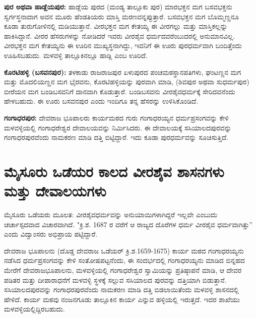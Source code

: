 \textbf{ಪುರ ಅಥವಾ ಹಾಡ್ಲೆಯಪುರ:} ಹಾಡ್ಲೆಯ ಪುರದ (ಮಂಡ್ಯ ತಾಲ್ಲೂಕು ಪುರ) ಮಾರಭಕ್ತನ ಮಗ ಬಸವಭಕ್ತನು ಸ್ವರ್ಗಸ್ಥನಾದಾಗ ಅವನ ಮೂರು ಹೆಂಡತಿಯರು ಮಾಸ್ತಿ ಮರಣವನ್ನಪ್ಪುತ್ತಾರೆ. ಬಸವಭಕ್ತನ ಮಗ ಬೊಮ್ಮಣ್ಣನೂ ಕೂಡಾ ತುರುಗೋಳಿನಲ್ಲಿ ಮಡಿಯುತ್ತಾನೆ. ವೀರಭಕ್ತನ ಮಗ ಕೇತಯ್ಯ ಈ ವೀರಗಲ್ಲು ಮತ್ತು ಮಾಸ್ತಿಕಲ್ಲನ್ನು ಹಾಕಿಸಿದ್ದಾನೆ. ವೀರರ ಹೆಸರುಗಳನ್ನು ನೋಡಿದರೆ ಇವರು ವೀರಶೈವ ಧರ್ಮದವರೆಂಬುದರಲ್ಲಿ ಅನುಮಾನವಿಲ್ಲ. ವೀರಭಕ್ತನ ಮಗ ಕೇತಯ್ಯನು ಈ ಊರಿನ ಮುಖ್ಯಸ್ಥನಾಗಿದ್ದು, ಇವನಿಗೆ ಈ ಊರು ಪುರಧರ್ಮವಾಗಿ ಬಂದಿತ್ತೆಂದು ಊಹಿಸಬಹುದು. ಮಳವಳ್ಳಿ ತಾಲ್ಲೂಕಿನಲ್ಲೂ ಹಾಡ್ಲಿ ಎಂಬ ಊರಿದೆ.

\textbf{ಕೊರಟಿಹಳ್ಳಿ (ಬಸವನಪುರ): }ತಳಕಾಡು ರಾಜರಾಜಪುರ ಏಳುಪುರದ ಪಂಚಮಠಸ್ಥಾನಪತಿಗಳು, ಘಂಟಣ್ಣನ ಮಗ ಮತ್ತು ಮೊದಲಿಯಣ್ಣನ ಮಗ ಭೈರವನು, ಕೊರಟಿಹಳ್ಳಿಯನ್ನು ಪುರವಾಗಿ ಮಾಡಿ, (ಶಿವಪುರ ಅಥವಾ ಸುಧರ್ಮಪುರ) ಬೀರೆಯನ ಮಗ ಬಂಡಿಬಸವನಿಗೆ ದಾನವಾಗಿ ಕೊಡುತ್ತಾರೆ. ಬಂಡಿಬಸವನು ವೀರಶೈವಧರ್ಮಕ್ಕೆ ಸೇರಿದವನೆಂದು ಹೇಳ\-ಬಹುದು. ಈ ಊರು ಬಸವನಪುರ ಎಂದು ಇಂದಿಗೂ ತನ್ನ ಹೆಸರನ್ನು ಉಳಿಸಿಕೊಂಡಿದೆ.

\textbf{ಗಂಗಾಧರಪುರ:} ದೇವರಾಜ ಭೂಪಾಲರು ಕಾರ್ಯಮಠದ ಗುರು ಗಂಗಾಧರಯ್ಯನ ಧರ್ಮಪ್ರಸಂಗವನ್ನು ಕೇಳಿ ಮಳವಳ್ಳಿಯಲ್ಲಿ ಗಂಗಾಧರೇಶ್ವರ ದೇವಾಲಯವನ್ನು ನಿರ್ಮಿಸಿದರು. ಈ ದೇವಾಲಯಕ್ಕೆ ಸಸಿಯಾಲದಪುರವನ್ನು ಗಂಗಾಧರಪುರವೆಂದು ನಾಮಕರಣ ಮಾಡಿ ದತ್ತಿ ಬಿಟ್ಟಿದ್ದಾರೆ. ಇದು ಕೂಡಾ ಪುರಧರ್ಮವನ್ನು ಸೂಚಿಸುತ್ತಿದೆ.


\section*{ಮೈಸೂರು ಒಡೆಯರ ಕಾಲದ ವೀರಶೈವ ಶಾಸನಗಳು ಮತ್ತು ದೇವಾಲಯಗಳು}

ಮೈಸೂರು ಒಡೆಯರು ಮೂಲತ: ವೀರಶೈವಧರ್ಮವನ್ನು ಅನುಯಾಯಿಗಳಾಗಿದ್ದರೆ ಇಲ್ಲವೇ ಎಂಬುದು ಚರ್ಚಾಸ್ಪದವಾದ ವಿಚಾರವಾಗಿದೆ. "ಕ್ರಿ.ಶ. 1687 ರ ವರೆಗೆ ಆ ರಾಜ್ಯದ ದೊರೆಗಳ ಧರ್ಮ ವೀರಶೈವ ಧರ್ಮವಾಗಿತ್ತು” ಎಂದು ವಿದ್ವಾಂಸರು ಅಭಿಪ್ರಾಯ ಪಟ್ಟಿದ್ದಾರೆ.

ದೇವರಾಜ ಭೂಪಾಲನು (ದೊಡ್ಡ ದೇವರಾಜ ಒಡೆಯರ್​ ಕ್ರಿ.ಶ.1659-1675) ಕಾರ್ಯ ಮಠದ ಗಂಗಾಧರಯ್ಯನು ನಡೆಸಿದ ಧರ್ಮಪ್ರಸಂಗವನ್ನು ಕೇಳಿ ಸಂತೋಷಪಟ್ಟನೆಂದು, ಈ ಸಂದರ್ಭದಲ್ಲಿ ಗಂಗಾಧರಯ್ಯನು ಮಾಡಿದ ಬಿನ್ನಹದ ಮೇರೆಗೆ ದೇವರಾಜಭೂಪಾಲನು, ಮಳವಳ್ಳಿಯಲ್ಲಿ ಗಂಗಾಧರೇಶ್ವರ ಸ್ವಾಮಿಯನ್ನು ಪ್ರತಿಷ್ಠಾಪನೆ ಮಾಡಿ, ಆ ದೇವರ ಪಡಿತರ ಮತ್ತು ದೀಪಾರಾಧನೆಗೆ ಮಳವಳ್ಳಿ ಸ್ಥಳಕ್ಕೆ ಸಲ್ಲುವ ಸಸಿಯಾಲದ ಪುರವನ್ನು ದತ್ತಿಯಾಗಿ ಬಿಡುತ್ತಾನೆ. ಸಸಿಯಾಲದಪುರವನ್ನು ಗಂಗಾಧರಪುರವೆಂದು ನಾಮಕರಣ ಮಾಡಿ ದತ್ತಿ ಬಿಡಲಾಯಿತೆಂದು ಮಳವಳ್ಳಿ ಶಾಸನದಲ್ಲಿ ಹೇಳಿದೆ. ಕಾರ್ಯ ಮಠವು ನಂಜನಗೂಡು ತಾಲ್ಲೂಕಿನ ಕಾರ್ಯ ಎನ್ನುವ ಹಳ್ಳಿಯಲ್ಲಿ ಇರುತ್ತದೆ. ಇದರ ಶಾಖೆಯು ಮಳವಳ್ಳಿಯಲ್ಲಿದ್ದಿರಬಹುದು.

